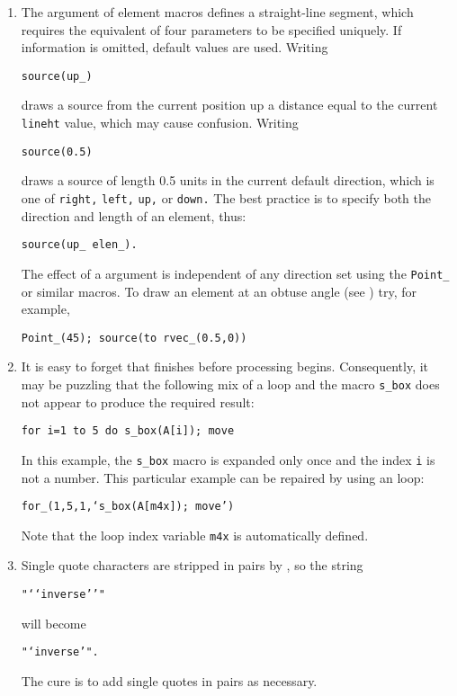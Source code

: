 \begin{enumerate}
\item 
{}
The \linespec argument of element
macros defines a straight-line segment, which requires
the equivalent of four parameters to be specified uniquely.
If information is omitted, default values are used.  Writing

{\tt source(up\_)}

\noindent draws a source from the current position up a distance equal
to the current {\tt lineht} value, which may cause confusion.
Writing

{\tt source(0.5)}

\noindent draws a source of length 0.5 units
in the current \pic default direction, which is one of
{\tt right,} {\tt left,} {\tt up,} or {\tt down.}
The best practice is
to specify both the direction and length of an element, thus:

{\tt source(up\_ elen\_).}

The effect of a \linespec argument is independent of any direction
set using the {\tt Point\_} or similar macros. 
To draw an element at an obtuse angle (see ) try,
for example,

{\tt Point\_(45); source(to rvec\_(0.5,0))}

\item 
{}
It is easy to forget that \Mfour finishes before \pic processing
begins. Consequently, it may be puzzling that the following mix of
a \pic loop and the \Mfour macro {\tt s\_box} does not appear to produce
the required result:

{\tt for i=1 to 5 do \lbr s\_box(A[i]); move \rbr}

\noindent In this example, the {\tt s\_box} macro is expanded only once
and the index {\tt i} is not a number.  This particular example can be
repaired by using an \Mfour loop:

{\tt for\_(1,5,1,`s\_box(A[m4x]); move')}

Note that the loop index variable {\tt m4x} is automatically defined.

\item 
{}
 Single quote characters are stripped in pairs by \Mfour, so the string

{\tt "{`}{`}inverse{'}{'}"}

\noindent will become

{\tt "{`}inverse{'}".}

\noindent The cure is to add single quotes in pairs as necessary.


\end{enumerate}
